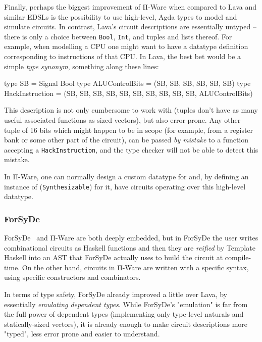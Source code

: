         Finally, perhaps the biggest improvement of Π-Ware when compared to Lava and similar \acp{EDSL}
        is the possibility to use high-level, Agda types to model and simulate circuits.
        In contrast, Lava's circuit descriptions are essentially untyped – there is only a choice
        between \texttt{Bool}, \texttt{Int}, and tuples and lists thereof.
        For example, when modelling a CPU one might want to have a datatype definition corresponding
        to instructions of that CPU. In Lava, the best bet would be a simple \emph{type synonym},
        something along these lines:

        \begin{haskellcode}
        type SB = Signal Bool
        type ALUControlBits = (SB, SB, SB, SB, SB, SB)
        type HackInstruction = (SB, SB, SB, SB, SB, SB, SB, SB, SB, SB, ALUControlBits)
        \end{haskellcode}

        This description is not only cumbersome to work with
        (tuples don't have as many useful associated functions as sized vectors),
        but also error-prone.
        Any other tuple of 16 bits which might happen to be in scope
        (for example, from a register bank or some other part of the circuit),
        can be passed \emph{by mistake} to a function accepting a \texttt{HackInstruction},
        and the type checker will not be able to detect this mistake.

        In Π-Ware, one can normally design a custom datatype for  and, by defining
        an instance of  (\texttt{Synthesizable}) for it, have circuits operating over this
        high-level datatype.

        \subsubsection{ForSyDe}

        ForSyDe~\cite{forsyde1999} and Π-Ware are both deeply embedded, but in ForSyDe the user
        writes combinational circuits as Haskell functions and then they are \emph{reified}
        by Template Haskell into an \ac{AST} that ForSyDe actually uses to build the circuit at compile-time.
        On the other hand, circuits in Π-Ware are written with a specific syntax, using specific constructors
        and combinators.

        In terms of type safety, ForSyDe already improved a little over Lava, by essentially
        \emph{emulating dependent types}.
        While ForSyDe's "emulation" is far from the full power of dependent types
        (implementing only type-level naturals and statically-sized vectors),
        it is already enough to make circuit descriptions more "typed", less error prone and
        easier to understand.

